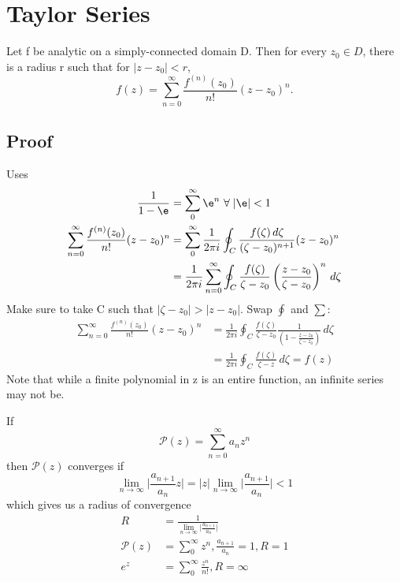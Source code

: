 \documentclass[a4paper, 11pt, normalem]{report}
\begin{document}
\section{Taylor Series}
Let f be analytic on a simply-connected domain D.
Then for every $z_0 \in D$, there is a radius r such that for $|z - z_0| < r$,
\begin{equation}
    f(z) = \sum_{n=0}^{\infty} \frac{f^{(n)}(z_0)}{n!} (z - z_0)^n.
\end{equation}

\subsection{Proof}
Uses
\begin{align}
    \frac{1}{1 - \e} &= \sum_0^\infty \e^n ~\forall \;|\e| < 1 \\
    \sum_{n=0}^\infty \frac{f^{(n)}(z_0)}{n!}(z-z_0)^n &= \sum_0^\infty \frac{1}{2\pi i} \oint_C \frac{f(\zeta)\,d\zeta}{(\zeta - z_0)^{n+1}}(z - z_0)^n \\
                                                       &= \frac{1}{2\pi i}\sum_{n=0}^\infty \oint_C \frac{f(\zeta)}{\zeta - z_0} \left(\frac{z - z_0}{\zeta - z_0}\right)^n\,d\zeta
\end{align}
Make sure to take C such that $|\zeta - z_0| > |z - z_0|$.
Swap $\oint$ and $\sum$:
\begin{align}
    \sum_{n=0}^\infty \frac{f^{(n)}(z_0)}{n!} (z-z_0)^n &= \frac{1}{2\pi i} \oint_C \frac{f(\zeta)}{\zeta - z_0} \frac{1}{\left(1 - \frac{z-z_0}{\zeta-z_0}\right)}\,d\zeta \\
    &= \frac{1}{2\pi i} \oint_C \frac{f(\zeta)}{\zeta - z}\,d\zeta = f(z)
\end{align}
Note that while a finite polynomial in z is an entire function, an infinite series may not be.

If
\begin{equation}
    \mathcal{P}(z) = \sum_{n=0}^\infty a_nz^n
\end{equation}
then $\mathcal{P}(z)$ converges if
\begin{equation}
    \lim_{n\to\infty} \bigg|\frac{a_{n+1}}{a_n}z\bigg| = |z|\lim_{n\to\infty}\bigg|\frac{a_{n+1}}{a_n}\bigg| < 1
\end{equation}
which gives us a radius of convergence
\begin{align}
    R &= \frac{1}{\lim_{n\to\infty}\big|\frac{a_{n+1}}{a_n}\big|} \\
    \mathcal{P}(z) &= \sum_0^\infty z^n, \frac{a_{n+1}}{a_n} = 1, R = 1 \\
    e^z &= \sum_0^\infty \frac{z^n}{n!}, R = \infty
\end{align}
\end{document}
